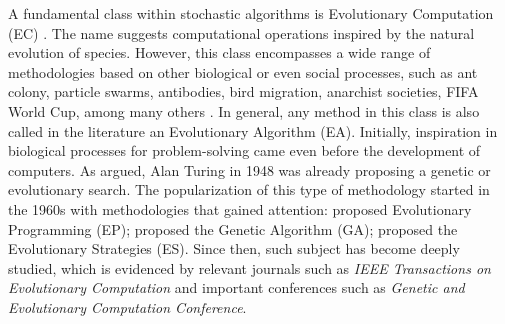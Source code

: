 		A fundamental class within stochastic algorithms is Evolutionary Computation (EC) \citep{eiben2015introduction}. The name suggests computational operations inspired by the natural evolution of species. However, this class encompasses a wide range of methodologies based on other biological or even social processes, such as ant colony, particle swarms, antibodies, bird migration, anarchist societies, FIFA World Cup, among many others \citep{campelo2018ecbestiary}. In general, any method in this class is also called in the literature an Evolutionary Algorithm (EA). Initially, inspiration in biological processes for problem-solving came even before the development of computers. As \cite{fogel1998evolutionary} argued, Alan Turing in 1948 was already proposing a genetic or evolutionary search. The popularization of this type of methodology started in the 1960s with methodologies that gained attention: \cite{fogel1966artificial} proposed Evolutionary Programming (EP); \cite{holland1973genetic} proposed the Genetic Algorithm (GA); \cite{vent1975rechenberg} proposed the Evolutionary Strategies (ES). Since then, such subject has become deeply studied, which is evidenced by relevant journals such as \textit{IEEE Transactions on Evolutionary Computation} and important conferences such as \textit{Genetic and Evolutionary Computation Conference}.
		

